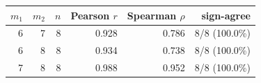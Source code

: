 \begingroup
{}
\scriptsize
\setlength{\tabcolsep}{4pt}
\renewcommand{\arraystretch}{1.10}
\setlength{\LTleft}{0pt}
\setlength{\LTright}{0pt}
\begin{longtable}{r r r r r r}
\toprule
$m_1$ & $m_2$ & $n$ & Pearson $r$ & Spearman $\rho$ & sign-agree \\
\midrule
6 & 7 & 8 & 0.928 & 0.786 & 8/8 (100.0\%) \\
6 & 8 & 8 & 0.934 & 0.738 & 8/8 (100.0\%) \\
7 & 8 & 8 & 0.988 & 0.952 & 8/8 (100.0\%) \\
\bottomrule
\end{longtable}
\endgroup

